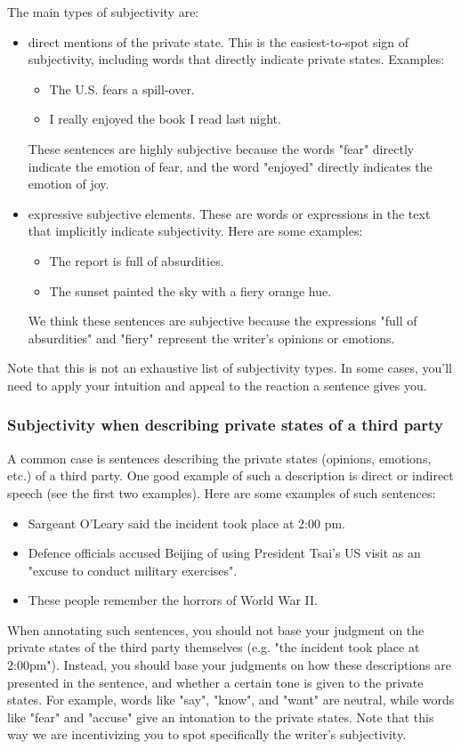\documentclass[conference]{IEEEtran}
\begin{document}
The main types of subjectivity are:
\begin{itemize}
    \item direct mentions of the private state. This is the easiest-to-spot sign of subjectivity, including words that directly indicate private states. Examples: \begin{itemize}
        \item The U.S. fears a spill-over.
        \item I really enjoyed the book I read last night.
    \end{itemize}
    These sentences are highly subjective because the words "fear" directly indicate the emotion of fear, and the word "enjoyed" directly indicates the emotion of joy.
    \item expressive subjective elements. These are words or expressions in the text that implicitly indicate subjectivity. Here are some examples:
    \begin{itemize}
        \item The report is full of absurdities.
        \item The sunset painted the sky with a fiery orange hue.
    \end{itemize}
    We think these sentences are subjective because the expressions "full of absurdities" and "fiery" represent the writer's opinions or emotions.
\end{itemize}
Note that this is not an exhaustive list of subjectivity types. In some cases, you'll need to apply your intuition and appeal to the reaction a sentence gives you.

\subsubsection*{Subjectivity when describing private states of a third party}
A common case is sentences describing the private states (opinions, emotions, etc.) of a third party. One good example of such a description is direct or indirect speech (see the first two examples). Here are some examples of such sentences:
\begin{itemize}
    \item Sargeant O’Leary said the incident took place at 2:00 pm.
    \item Defence officials accused Beijing of using President Tsai's US visit as an "excuse to conduct military exercises".
    \item These people remember the horrors of World War II.
\end{itemize}
When annotating such sentences, you should not base your judgment on the private states of the third party themselves (e.g. "the incident took place at 2:00pm"). Instead, you should base your judgments on how these descriptions are presented in the sentence, and whether a certain tone is given to the private states. For example, words like "say", "know", and "want" are neutral, while words like "fear" and "accuse" give an intonation to the private states. Note that this way we are incentivizing you to spot specifically the writer's subjectivity.
\end{document}
